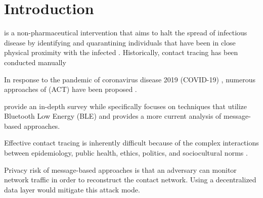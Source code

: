 \chapter{Introduction}

 is a non-pharmaceutical intervention that aims to halt the spread of infectious disease by identifying and quarantining individuals that have been in close physical proximity with the infected \citep{Brandt2022, PozoMartin2023}. Historically, contact tracing has been conducted manually

In response to the pandemic of coronavirus disease 2019 (COVID-19) \citep{Zhu2020, Gorbalenya2020, Singh2021}, numerous approaches of  (ACT) have been proposed \citep{Shubina2020, Reichert2021}.

\citet{Shubina2020} provide an in-depth survey while \citet{Reichert2021} specifically focuses on techniques that utilize Bluetooth Low Energy (BLE) and provides a more current analysis of message-based approaches.



Effective contact tracing is inherently difficult because of the complex interactions between epidemiology, public health, ethics, politics, and sociocultural norms \citep{Brandt2022}.


Privacy risk of message-based approaches is that an adversary can monitor network traffic in order to reconstruct the contact network. Using a decentralized data layer would mitigate this attack mode.


